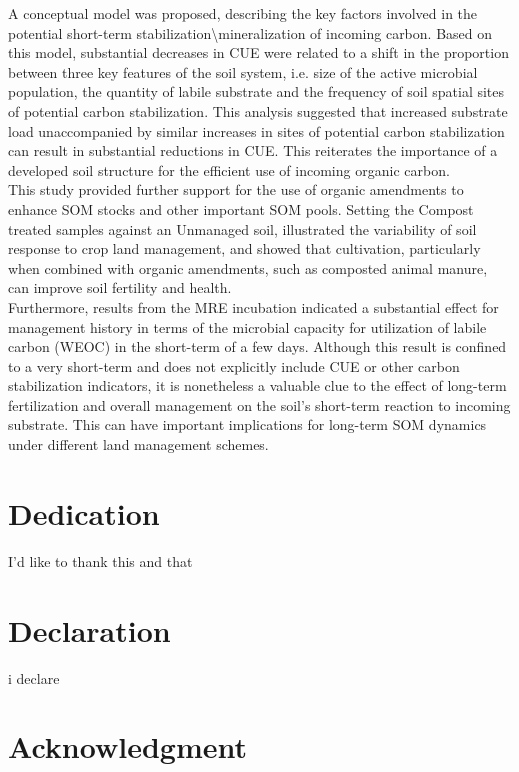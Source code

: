 \documentclass[12pt]{report}
\begin{document}
	    A conceptual model was proposed, describing the key factors involved in the potential short-term stabilization\textbackslash mineralization of incoming carbon. Based on this model, substantial decreases in CUE were related to a shift in the proportion between three key features of the soil system, i.e. size of the active microbial population, the quantity of labile substrate and the frequency of soil spatial sites of potential carbon stabilization. This analysis suggested that increased substrate load unaccompanied by similar increases in sites of potential carbon stabilization can result in substantial reductions in CUE. This reiterates the importance of a developed soil structure for the efficient use of incoming organic carbon.\\
	    This study provided further support for the use of organic amendments to enhance SOM stocks and other important SOM pools. Setting the Compost treated samples against an Unmanaged soil, illustrated the variability of soil response to crop land management, and showed that cultivation, particularly when combined with organic amendments, such as composted animal manure, can improve soil fertility and health.\\
	    Furthermore, results from the MRE incubation indicated a substantial effect for management history in terms of the microbial capacity for utilization of labile carbon (WEOC) in the short-term of a few days. Although this result is confined to a very short-term and does not explicitly include CUE or other carbon stabilization indicators, it is nonetheless a valuable clue to the effect of long-term fertilization and overall management on the soil's short-term reaction to incoming substrate. This can have important implications for long-term SOM dynamics under different land management schemes.  
	    
	    
	    
	    

	\chapter*{Dedication}
	    I'd like to thank this and that

	\chapter*{Declaration}
	i declare

	\chapter*{Acknowledgment}
	\tableofcontents
\end{document}
